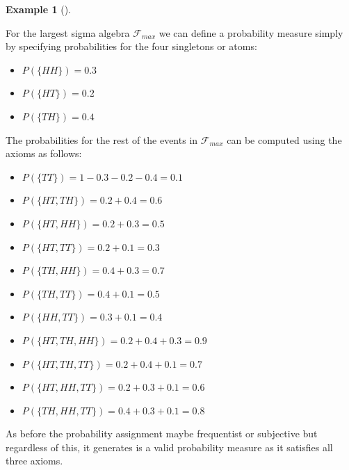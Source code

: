 \documentclass[
  letterpaper,
  DIV=11,
  numbers=noendperiod]{scrreport}
\providecommand{\tightlist}{%
  \setlength{\itemsep}{0pt}\setlength{\parskip}{0pt}}
\theoremstyle{definition}
\newtheorem{example}{Example}[chapter]
\theoremstyle{plain}
\theoremstyle{definition}
\theoremstyle{plain}
\theoremstyle{remark}
\begin{document}
\begin{tcolorbox}[enhanced jigsaw, breakable, opacityback=0, leftrule=.75mm, colback=white, bottomtitle=1mm, coltitle=black, toptitle=1mm, titlerule=0mm, bottomrule=.15mm, colframe=quarto-callout-note-color-frame, title={Probability measure for power set}, opacitybacktitle=0.6, colbacktitle=quarto-callout-note-color!10!white, rightrule=.15mm, arc=.35mm, toprule=.15mm, left=2mm]

\begin{example}[]\protect\hypertarget{exm-probability-measure-power-set}{}\label{exm-probability-measure-power-set}

For the largest sigma algebra \(\mathcal F_{max}\) we can define a
probability measure simply by specifying probabilities for the four
singletons or atoms:

\begin{itemize}
\tightlist
\item
  \(P(\{HH\}) = 0.3\)
\item
  \(P(\{HT\}) = 0.2\)
\item
  \(P(\{TH\}) = 0.4\)
\end{itemize}

The probabilities for the rest of the events in \(\mathcal F_{max}\) can
be computed using the axioms as follows:

\begin{itemize}
\tightlist
\item
  \(P(\{TT\}) = 1-0.3-0.2-0.4 = 0.1\)
\item
  \(P(\{HT,TH\}) = 0.2 + 0.4 = 0.6\)
\item
  \(P(\{HT,HH\}) = 0.2 + 0.3 = 0.5\)
\item
  \(P(\{HT,TT\}) = 0.2 + 0.1 = 0.3\)
\item
  \(P(\{TH,HH\}) = 0.4 + 0.3 = 0.7\)
\item
  \(P(\{TH,TT\}) = 0.4 + 0.1 = 0.5\)
\item
  \(P(\{HH,TT\}) = 0.3 + 0.1 = 0.4\)
\item
  \(P(\{HT,TH,HH\}) = 0.2 + 0.4 + 0.3 = 0.9\)
\item
  \(P(\{HT,TH,TT\}) = 0.2 + 0.4 + 0.1 = 0.7\)
\item
  \(P(\{HT,HH,TT\}) = 0.2 + 0.3 + 0.1 = 0.6\)
\item
  \(P(\{TH,HH,TT\}) = 0.4 + 0.3 + 0.1 = 0.8\)
\end{itemize}

As before the probability assignment maybe frequentist or subjective but
regardless of this, it generates is a valid probability measure as it
satisfies all three axioms.

\end{example}

\end{tcolorbox}
\end{document}
